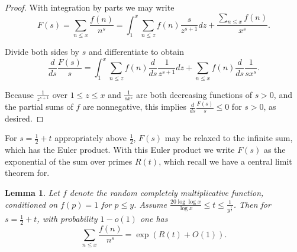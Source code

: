 \documentclass[12pt]{amsart}
\newtheorem{lemma}[theorem]{Lemma}
\theoremstyle{remark}
\theoremstyle{definition}
\theoremstyle{remark}
\numberwithin{equation}{section}
\begin{document}
\begin{proof}
    With integration by parts we may write
    $$F(s) = \sum_{n \le x} \frac{f(n)}{n^s} = \int_{1}^x \sum_{n \le z} f(n) \frac{s}{z^{s+1}}dz +\frac{\sum_{n\le x} f(n)}{x^s}.$$

    Divide both sides by $s$ and differentiate to obtain
    $$\frac{d}{ds}\frac{F(s)}{s} = \int_{1}^x \sum_{n \le z} f(n) \frac{d}{ds}\frac{1}{z^{s+1}}dz +\sum_{n\le x} f(n)\frac{d}{ds}\frac{1}{sx^s}.$$
    
Because $\frac{1}{z^{s+1}}$ over $1 \le z \le x$ and $\frac{1}{sx^s}$ are both decreasing functions of $s>0$, and the partial sums of $f$ are nonnegative, this implies $\frac{d}{ds}\frac{F(s)}{s}\le 0$ for $s>0$, as desired.
\end{proof}

For $s = \frac{1}{2}+t$ appropriately above $\frac{1}{2}$, $F(s)$ may be relaxed to the infinite sum, which has the Euler product.  With this Euler product we write $F(s)$ as the exponential of the sum over primes $R(t)$, which recall we have a central limit theorem for.


\begin{lemma}\label{transition} 
     Let $f$ denote the random completely multiplicative function, conditioned on $f(p) = 1$ for $p \le y$. Assume $\frac{20\log \log x}{\log x}\le t \le \frac{1}{y^{\frac{1}{2}}}$. Then for $s = \frac{1}{2} + t$, with probability $1-o(1)$ one has
$$\sum_{n \le x} \frac{f(n)}{n^s} = \exp(R(t)+O(1)).$$
\end{lemma}
\end{document}
